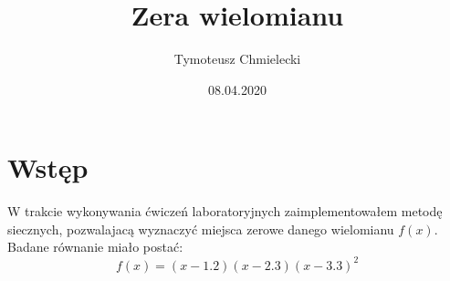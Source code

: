 \documentclass[13pt]{article}
\begin{document}
\title{\textbf{Zera wielomianu}}
\author{Tymoteusz Chmielecki}
\date{08.04.2020}
\maketitle

\section{Wstęp}
W trakcie wykonywania ćwiczeń laboratoryjnych zaimplementowałem metodę siecznych, pozwalajacą wyznaczyć miejsca zerowe danego wielomianu $ f(x) $. Badane równanie miało postać:
$$ f(x) = (x - 1.2)(x-2.3)(x-3.3)^2 $$
\end{document}
